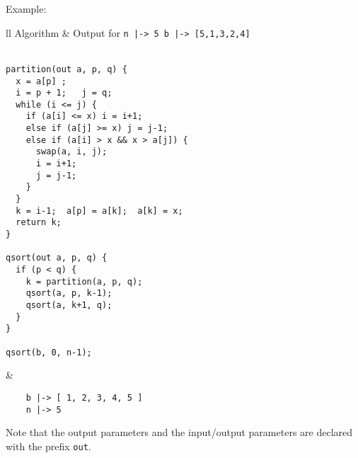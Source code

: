 \documentclass[a4paper]{report}
\begin{document}
Example:
\begin{center}
\begin{tabular}{ll}
Algorithm & Output for \verb"n |-> 5 b |-> [5,1,3,2,4]"\\
\hline
\\
\begin{minipage}{.55\textwidth}
\begin{verbatim}
partition(out a, p, q) {
  x = a[p] ; 
  i = p + 1;   j = q;
  while (i <= j) {
    if (a[i] <= x) i = i+1;
    else if (a[j] >= x) j = j-1;
    else if (a[i] > x && x > a[j]) {
      swap(a, i, j);
      i = i+1;
      j = j-1;
    }
  }
  k = i-1;  a[p] = a[k];  a[k] = x;
  return k;
}

qsort(out a, p, q) {
  if (p < q) {
    k = partition(a, p, q);
    qsort(a, p, k-1);
    qsort(a, k+1, q);
  }
}

qsort(b, 0, n-1);
\end{verbatim}
\end{minipage}
&
\begin{minipage}{.42\textwidth}
\begin{verbatim}
    b |-> [ 1, 2, 3, 4, 5 ]
    n |-> 5
\end{verbatim}
\end{minipage}
\end{tabular}
\end{center}
Note that the output parameters and the input/output parameters are declared with the prefix {\tt out}.
\end{document}
